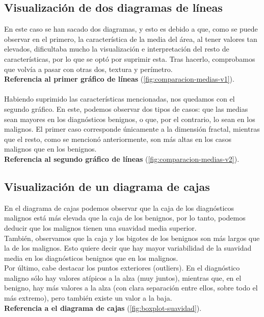\documentclass{llncs}
\begin{document}
\subsection{Visualización de dos diagramas de líneas}
{En este caso se han sacado dos diagramas, y esto es debido a que, como se puede observar en el primero, la característica de la media del área, al tener valores tan elevados, dificultaba mucho la visualización e interpretación del resto de características, por lo que se optó por suprimir esta. Tras hacerlo, comprobamos que volvía a pasar con otras dos, textura y perímetro.}\\
\textbf{Referencia al primer gráfico de líneas }(\ref{fig:comparacion-medias-v1}). \\
\\ {Habiendo suprimido las características mencionadas, nos quedamos con el segundo gráfico. En este, podemos observar dos tipos de casos: que las medias sean mayores en los diagnósticos benignos, o que, por el contrario, lo sean en los malignos. El primer caso corresponde únicamente a la dimensión fractal, mientras que el resto, como se mencionó anteriormente, son más altas en los casos malignos que en los benignos.}\\
\textbf{Referencia al segundo gráfico de líneas }(\ref{fig:comparacion-medias-v2}).

\subsection{Visualización de un diagrama de cajas} 

{En el diagrama de cajas podemos observar que la caja de los diagnósticos malignos está más elevada que la caja de los benignos, por lo tanto, podemos deducir que los malignos tienen una suavidad media superior.\\
También, observamos que la caja y los bigotes de los benignos son más largos que la de los malignos. Esto quiere decir que hay mayor variabilidad de la suavidad media en los diagnósticos benignos que en los malignos.\\
Por último, cabe destacar los puntos exteriores (outliers). En el diagnóstico maligno sólo hay valores atípicos a la alza (muy juntos), mientras que, en el benigno, hay más valores a la alza (con clara separación entre ellos, sobre todo el más extremo), pero también existe un valor a la baja.}
\\\textbf{Referencia a el diagrama de cajas }(\ref{fig:boxplot-suavidad}).
\end{document}
